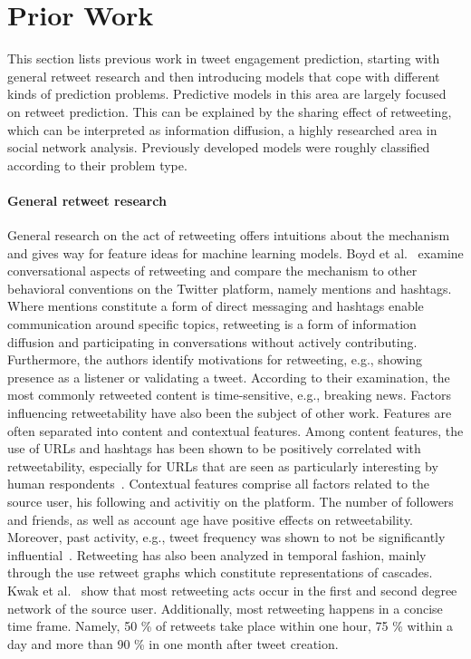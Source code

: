 \section{Prior Work}
\label{sec:prior_work}

This section lists previous work in tweet engagement prediction, starting with
general retweet research and then introducing models that cope with different
kinds of prediction problems.
Predictive models in this area are largely focused on retweet prediction.
This can be explained by the sharing effect of retweeting, which can be interpreted
as information diffusion, a highly researched area in social network analysis.
Previously developed models were roughly classified according to their problem type.

\paragraph{General retweet research}

General research on the act of retweeting offers intuitions about the mechanism
and gives way for feature ideas for machine learning models.
Boyd et al.~\cite{Golder} examine conversational aspects of retweeting and
compare the mechanism to other behavioral conventions on the Twitter platform,
namely mentions and hashtags.
Where mentions constitute a form of direct messaging and hashtags enable
communication around specific topics, retweeting is a form of information
diffusion and participating in conversations without actively contributing.
Furthermore, the authors identify motivations for retweeting, e.g., showing
presence as a listener or validating a tweet.
According to their examination, the most commonly retweeted content is
time-sensitive, e.g., breaking news.
Factors influencing retweetability have also been the subject of other work.
Features are often separated into content and contextual features.
Among content features, the use of URLs and hashtags has been shown to be
positively correlated with retweetability, especially for URLs that are seen
as particularly interesting by human respondents~\cite{Suh}.
Contextual features comprise all factors related to the source user, his
following and activitiy on the platform.
The number of followers and friends, as well as account age have positive
effects on retweetability.
Moreover, past activity, e.g., tweet frequency was shown to not be significantly
influential~\cite{Bakshy2011, Suh}.
Retweeting has also been analyzed in temporal fashion, mainly through the use
retweet graphs which constitute representations of cascades.
Kwak et al.~\cite{Kwak2010} show that most retweeting acts occur in the first
and second degree network of the source user.
Additionally, most retweeting happens in a concise time frame.
Namely, 50 \% of retweets take place within one hour, 75 \% within a day and more
than 90 \% in one month after tweet creation.

